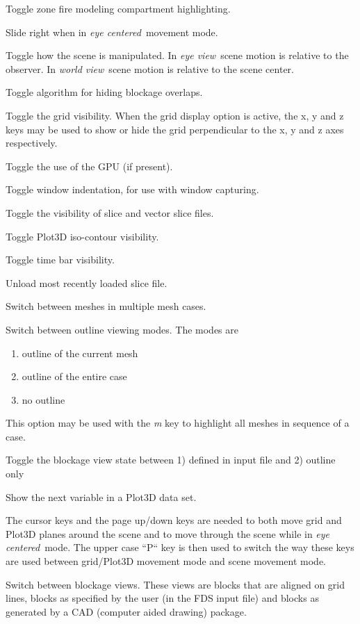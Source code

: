 \documentclass[11pt,twoside]{book}
\newcommand{\kitem}[1]{\item[{\bf {\tt #1 \  }} \hfill]}
\begin{document}
\kitem{C}Toggle zone fire modeling compartment highlighting.

\kitem{d,D}Slide right when in {\em eye centered}\ movement mode.

\kitem{e,E}Toggle how the scene is manipulated.  In {\em eye
view}\ scene motion is relative to the observer.  In {\em world
view}\ scene motion is relative to the scene center.

\kitem{F}Toggle algorithm for hiding blockage overlaps.

\kitem{g}Toggle the grid visibility.  When the grid display option
is active, the x, y and z keys may be used to show or hide the
grid perpendicular to the x, y and z axes respectively.

\kitem{G}Toggle the use of the GPU (if present).

 \kitem{h}Toggle window indentation, for use with window
capturing.

\kitem{H}Toggle the visibility of slice and vector slice files.

\kitem{i,I}Toggle Plot3D iso-contour visibility.

\kitem{k,K}Toggle time bar visibility.

\kitem{L}Unload most recently loaded slice file.


\kitem{m,M}Switch between meshes in multiple mesh cases.

\kitem{o}Switch between outline viewing modes. The modes are
\begin{enumerate}
\item outline of the current mesh
\item outline of the entire case
\item no outline
\end{enumerate}
This option may be used with the {\em m} key to highlight all meshes in sequence of a case.

\kitem{O}Toggle the blockage view state between 1) defined in input file and 2) outline only

\kitem{p}Show the next variable in a Plot3D data set.

\kitem{P}The cursor keys and the page up/down keys are needed to
both move grid and Plot3D planes around the scene and to move
through the scene while in {\em eye centered}\ mode.  The upper
case ``P`` key is then used to switch the way these keys are used
between grid/Plot3D movement mode and scene movement mode.


\kitem{q,Q}Switch between blockage views.  These views are blocks
that are aligned on grid lines, blocks as specified by the user
(in the FDS input file) and blocks as generated by a CAD (computer
aided drawing) package.
\end{document}
